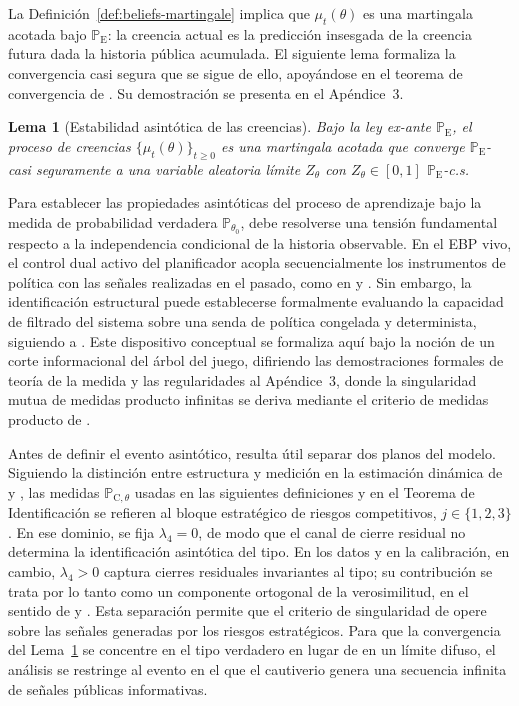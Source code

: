 \documentclass[review,authoryear,12pt]{elsarticle}
\theoremstyle{plain}
\newtheorem{lemma}[theorem]{Lema}
\theoremstyle{definition}
\newcommand{\ProbE}{\mathbb{P}_{\mathrm{E}}}
\newcommand{\ProbC}[1]{\mathbb{P}_{\mathrm{C},#1}}
\newcommand{\1}{\mathbf{1}}
\begin{document}
La Definición~\ref{def:beliefs-martingale} implica que $\mu_t(\theta)$ es una martingala acotada bajo $\ProbE$: la creencia actual es la predicción insesgada de la creencia futura dada la historia pública acumulada. El siguiente lema formaliza la convergencia casi segura que se sigue de ello, apoyándose en el teorema de convergencia de \citet{Doob1953Stochastic}. Su demostración se presenta en el Apéndice~3.

\begin{lemma}[Estabilidad asintótica de las creencias]\label{lem:asymptotic-beliefs}
Bajo la ley ex-ante $\ProbE$, el proceso de creencias $\{\mu_t(\theta)\}_{t\ge 0}$ es una martingala acotada que converge $\ProbE$-casi seguramente a una variable aleatoria límite $Z_\theta$ con $Z_\theta\in[0,1]$ $\ProbE$-c.s.
\end{lemma}

\smallskip

Para establecer las propiedades asintóticas del proceso de aprendizaje bajo la medida de probabilidad verdadera $\mathbb{P}_{\theta_0}$, debe resolverse una tensión fundamental respecto a la independencia condicional de la historia observable. En el EBP vivo, el control dual activo del planificador acopla secuencialmente los instrumentos de política con las señales realizadas en el pasado, como en \citet{AghionBoltonHarrisJullien1991} y \citet{EasleyKiefer1988}. Sin embargo, la identificación estructural puede establecerse formalmente evaluando la capacidad de filtrado del sistema sobre una senda de política congelada y determinista, siguiendo a \citet{BlackwellDubins1962}. Este dispositivo conceptual se formaliza aquí bajo la noción de un corte informacional del árbol del juego, difiriendo las demostraciones formales de teoría de la medida y las regularidades al Apéndice~3, donde la singularidad mutua de medidas producto infinitas se deriva mediante el criterio de medidas producto de \citet{Kakutani1948}.

Antes de definir el evento asintótico, resulta útil separar dos planos del modelo. Siguiendo la distinción entre estructura y medición en la estimación dinámica de \citet{Rust1987} y \citet{MagnacThesmar2002}, las medidas $\ProbC{\theta}$ usadas en las siguientes definiciones y en el Teorema de Identificación se refieren al bloque estratégico de riesgos competitivos, $j\in\{1,2,3\}$. En ese dominio, se fija $\lambda_4=0$, de modo que el canal de cierre residual no determina la identificación asintótica del tipo. En los datos y en la calibración, en cambio, $\lambda_4>0$ captura cierres residuales invariantes al tipo; su contribución se trata por lo tanto como un componente ortogonal de la verosimilitud, en el sentido de \citet{Lancaster1990} y \citet{AbbringVanDenBerg2003}. Esta separación permite que el criterio de singularidad de \citet{Kakutani1948} opere sobre las señales generadas por los riesgos estratégicos. Para que la convergencia del Lema~\ref{lem:asymptotic-beliefs} se concentre en el tipo verdadero en lugar de en un límite difuso, el análisis se restringe al evento en el que el cautiverio genera una secuencia infinita de señales públicas informativas.
\end{document}
